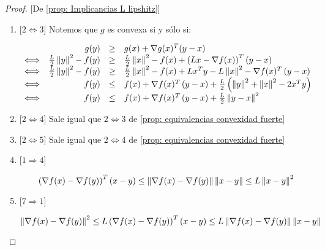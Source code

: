 \begin{proof}{[De \ref{prop: Implicancias L lipshitz}]}
	\begin{enumerate}
		\item {[$2 \Longleftrightarrow 3$]} Notemos que $g$ es convexa si y s\'olo si:
		
		\begin{equation*}
		\begin{array}{lrcl}
		& g(y) & \geq & g(x) + \nabla g(x) ^T (y-x) \\
		\Longleftrightarrow & \frac{L}{2}\left\lVert y\right\rVert^2 -  f(y)  & \geq & \frac{L}{2}\left\lVert x\right\rVert^2 -  f(x) + \left(Lx - \nabla f(x)\right)^T \left(y-x\right) \\
		\Longleftrightarrow & \frac{L}{2}\left\lVert y\right\rVert^2 -  f(y)  & \geq & \frac{L}{2}\left\lVert x\right\rVert^2 -  f(x) + Lx^Ty - L\left\lVert x\right\rVert^2 - \nabla f(x)^T \left(y-x\right) \\
		\Longleftrightarrow &f(y)   & \leq & f(x) + \nabla f(x)^T \left(y-x\right) + \frac{L}{2}\left(\left\lVert y\right\rVert^2 + \left\lVert x\right\rVert^2 -2 x^Ty\right)\\
		\Longleftrightarrow &f(y)   & \leq & f(x) + \nabla f(x)^T \left(y-x\right) + \frac{L}{2}\left\lVert y-x\right\rVert^2\\
		\end{array}
		\end{equation*}
		
		\item {[$2 \Longleftrightarrow 4$]} Sale igual que $2 \Longleftrightarrow 3$ de \ref{prop: equivalencias convexidad fuerte}
		
		\item {[$2 \Longleftrightarrow 5$]} Sale igual que $2 \Longleftrightarrow 4$ de \ref{prop: equivalencias convexidad fuerte}
		
		\item {[$1 \Longrightarrow 4$]} 
		
		\begin{equation*}
		\left(\nabla f(x) - \nabla f(y)\right)^T \left(x-y\right) \leq \left\lVert\nabla f(x) - \nabla f(y)\right\rVert\left\lVert x-y\right\rVert \leq L \left\lVert x-y\right\rVert^2 
		\end{equation*}
		
		\item {[$7 \Longrightarrow 1$]} 
		
		\begin{equation*}
		\left\lVert\nabla f(x) - \nabla f(y)\right\rVert^2 \leq L \left(\nabla f(x) - \nabla f(y)\right)^T \left(x-y\right) \leq L\left\lVert\nabla f(x) - \nabla f(y)\right\rVert\left\lVert x-y\right\rVert
		\end{equation*} 
		

\end{enumerate}
\end{proof}
